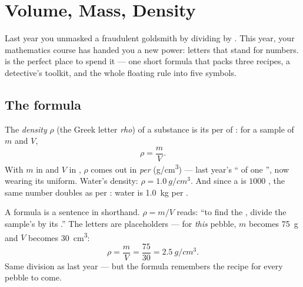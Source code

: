 \chapter{Volume, Mass, Density}\label{ch:g7:volume-mass-density}

Last year you unmasked a fraudulent goldsmith by dividing  by
. This year, your mathematics course has handed
you a new power: letters that stand for numbers.  is the
perfect place to spend it --- one short formula that packs three
recipes, a detective's toolkit, and the whole floating rule into
five symbols.

\section{The formula}

\begin{definition}\label{def:g7:volume-mass-density:formula}
The \emph{density} $\rho$ (the Greek letter
\emph{rho}) of a substance is its  per  of : for a
sample of  $m$ and  $V$,
\[
\rho = \frac{m}{V}.
\]
With $m$ in  and $V$ in , $\rho$ comes out
in \emph{ per } (\unit{g/cm^3}) --- last
year's `` of one '', now wearing its uniform.
Water's density: $\rho = \qty{1.0}{g/cm^3}$. And since a  is
$1000$ , the same number doubles as 
per : water is \qty{1.0}{kg} per .
\end{definition}

\begin{example}\label{ex:g7:volume-mass-density:reading}
A formula is a sentence in shorthand. $\rho = m/V$ reads: ``to
find the , divide the sample's  by its .'' The
letters are placeholders --- for \emph{this} pebble, $m$ becomes
\qty{75}{g} and $V$ becomes \qty{30}{cm^3}:
\[
\rho = \frac{m}{V} = \frac{75}{30} = \qty{2.5}{g/cm^3}.
\]
Same division as last year --- but the formula remembers the
recipe for every pebble to come.
\end{example}

